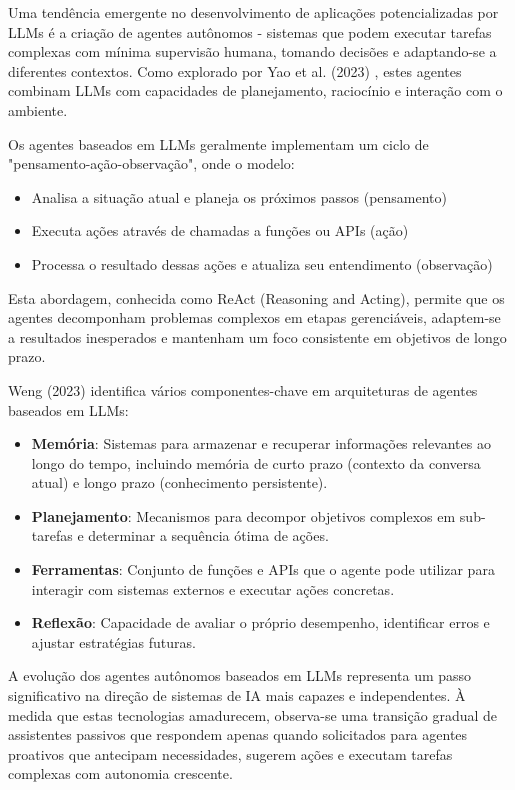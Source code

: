 \documentclass[tcc,capa]{texufpel}
\begin{document}
Uma tendência emergente no desenvolvimento de aplicações potencializadas por LLMs é a criação de agentes autônomos - sistemas que podem executar tarefas complexas com mínima supervisão humana, tomando decisões e adaptando-se a diferentes contextos. Como explorado por Yao et al. (2023) \cite{yao2023react}, estes agentes combinam LLMs com capacidades de planejamento, raciocínio e interação com o ambiente.

Os agentes baseados em LLMs geralmente implementam um ciclo de "pensamento-ação-observação", onde o modelo:

\begin{itemize}
    \item Analisa a situação atual e planeja os próximos passos (pensamento)
    \item Executa ações através de chamadas a funções ou APIs (ação)
    \item Processa o resultado dessas ações e atualiza seu entendimento (observação)
\end{itemize}

Esta abordagem, conhecida como ReAct (Reasoning and Acting), permite que os agentes decomponham problemas complexos em etapas gerenciáveis, adaptem-se a resultados inesperados e mantenham um foco consistente em objetivos de longo prazo.

Weng (2023) \cite{weng2023llm} identifica vários componentes-chave em arquiteturas de agentes baseados em LLMs:

\begin{itemize}
    \item \textbf{Memória}: Sistemas para armazenar e recuperar informações relevantes ao longo do tempo, incluindo memória de curto prazo (contexto da conversa atual) e longo prazo (conhecimento persistente).
    
    \item \textbf{Planejamento}: Mecanismos para decompor objetivos complexos em sub-tarefas e determinar a sequência ótima de ações.
    
    \item \textbf{Ferramentas}: Conjunto de funções e APIs que o agente pode utilizar para interagir com sistemas externos e executar ações concretas.
    
    \item \textbf{Reflexão}: Capacidade de avaliar o próprio desempenho, identificar erros e ajustar estratégias futuras.
\end{itemize}

A evolução dos agentes autônomos baseados em LLMs representa um passo significativo na direção de sistemas de IA mais capazes e independentes. À medida que estas tecnologias amadurecem, observa-se uma transição gradual de assistentes passivos que respondem apenas quando solicitados para agentes proativos que antecipam necessidades, sugerem ações e executam tarefas complexas com autonomia crescente. 
\end{document}
